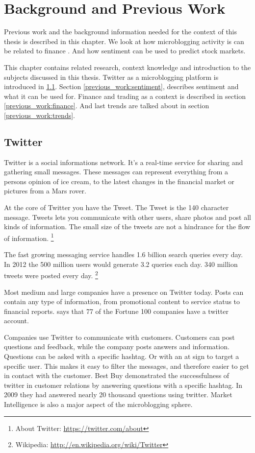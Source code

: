 \chapter{Background and Previous Work}\label{previous_work}
Previous work and the background information needed for the context of this
thesis is described in this chapter. We look at how microblogging activity is
can be related to finance \cite{bollen2011}. And how sentiment can be used to
predict stock markets.

This chapter contains related research, context knowledge and introduction to
the subjects discussed in this thesis. Twitter as a microblogging platform is
introduced in \ref{previous_work:twitter}. Section
\ref{previous_work:sentiment}, describes sentiment and what it can be used for.
Finance and trading as a context is described in section
\ref{previous_work:finance}. And last trends are talked about in section
\ref{previous_work:trends}.

\section{Twitter}\label{previous_work:twitter}
Twitter is a social informations network. 
It's a real-time service for sharing and gathering small messages. These
messages can represent everything from a persons opinion of ice cream, to the
latest changes in the financial market or pictures from a Mars rover. 

At the core of Twitter you have the Tweet. The Tweet is the 140 character
message. 
Tweets lets you communicate with other users, share photos and post all kinds of
information. The small size of the tweets are not a hindrance for the flow of
information. 
\footnote{About Twitter: \url{https://twitter.com/about}}

The fast growing messaging service handles 1.6 billion search queries every day.
In 2012 the 500 million users would generate 3.2 queries each day. 340 million tweets were posted every day. 
\footnote{Wikipedia: \url{http://en.wikipedia.org/wiki/Twitter}} 

Most medium and large companies have a presence on Twitter today. Posts can contain
any type of information, from promotional content to service status to
financial reports. \cite[p8]{annikajubbega11:twitter_driver_stock_price} says
that 77 of the Fortune 100 companies have a twitter account. 

Companies use Twitter to communicate with customers. Customers can post
questions and feedback, while the company posts answers and information.
Questions can be asked with a specific hashtag. Or with an at sign to target a
specific user. This makes it easy to filter the messages, and therefore easier
to get in contact with the customer. Best Buy demonstrated the successfulness of
twitter in customer relations by answering questions with a specific hashtag. In
2009 they had answered nearly 20 thousand questions using twitter.
\cite[p1]{Li2013206} Market Intelligence is also a major aspect of the
microblogging sphere.


